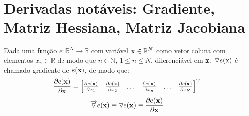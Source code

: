 
\section{Derivadas notáveis: Gradiente, Matriz Hessiana, Matriz Jacobiana}

\begin{proposition}\label{def:gradient}
 Dada uma função $e:\mathbb{R}^{N}\rightarrow \mathbb{R}$ com variável $\VECTOR{x} \in \mathbb{R}^{N}$
 como vetor coluna com elementos $x_n\in \mathbb{R}$ de modo que $n\in \mathbb{N}$, $1 \leq n \leq N$,
 diferenciável em $\VECTOR{x}$. 
 $\triangledown e(\VECTOR{x})$ é chamado gradiente 
\cite[pp. 913]{stewart2008calculus} \cite[pp. 80]{telles2015matematica} \cite{Gradient}  de $e(\VECTOR{x})$, de modo que: 
\begin{equation}
\frac{\partial e(\VECTOR{x})}{\partial \VECTOR{x} }=
\left[
\begin{matrix}
\frac{\partial e(\VECTOR{x}) }{\partial x_{1}}&
\frac{\partial e(\VECTOR{x}) }{\partial x_{2}}&
\hdots&
\frac{\partial e(\VECTOR{x}) }{\partial x_{n}}&
\hdots&
\frac{\partial e(\VECTOR{x}) }{\partial x_{N}}
\end{matrix}
\right]^{\transpose}
 \end{equation}
\begin{equation}
\overrightarrow{\triangledown} e(\VECTOR{x})\equiv  
\triangledown e(\VECTOR{x}) \equiv 
\frac{\partial e(\VECTOR{x})}{\partial \VECTOR{x} }
\end{equation}
\end{proposition}



